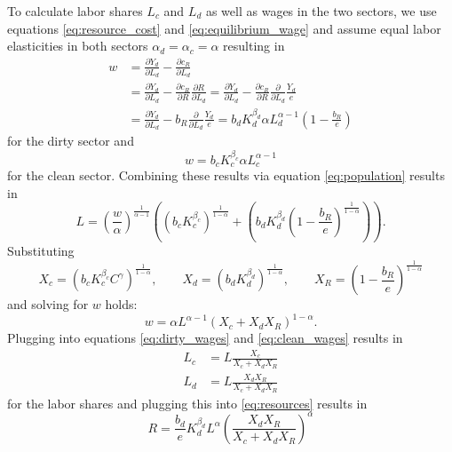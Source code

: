 To calculate labor shares $L_c$ and $L_d$ as well as wages in the two sectors, we use equations \eqref{eq:resource_cost} and \eqref{eq:equilibrium_wage} and assume equal labor elasticities in both sectors $\alpha_d = \alpha_c = \alpha$ resulting in
\begin{align}
	w &= \frac{\partial Y_d}{\partial L_d} - \frac{\partial c_R}{\partial L_d} \nonumber \\
	&= \frac{\partial Y_d}{\partial L_d} - \frac{\partial c_R}{\partial R} \frac{\partial R}{\partial L_d} \nonumber = \frac{\partial Y_d}{\partial L_d} - \frac{\partial c_R}{\partial R} \frac{\partial}{\partial L_d} \frac{Y_d}{e} \nonumber \\
	&= \frac{\partial Y_d}{\partial L_d} - b_R \frac{\partial}{\partial L_d} \frac{Y_d}{e} = b_d K_d^{\beta_d} \alpha L_d^{\alpha-1}\left( 1-\frac{b_R}{e} \right)
	\label{eq:dirty_wages}
\end{align}
for the dirty sector and
\begin{equation}
	w = b_c K_c^{\beta_c} \alpha L_c^{\alpha-1}
	\label{eq:clean_wages}
\end{equation}
for the clean sector. Combining these results via equation \eqref{eq:population} results in
\begin{equation}
	L = \left( \frac{w}{\alpha} \right)^{\frac{1}{\alpha-1}}\left( \left( b_c K_c^{\beta_c} \right)^{\frac{1}{1-\alpha}} + \left( b_d K_d^{\beta_d} \left( 1 - \frac{b_R}{e} \right)^{\frac{1}{1-\alpha}} \right) \right).
\end{equation}
Substituting 
\begin{equation}
	X_c = (b_c K_c^{\beta_c}C^{\gamma})^{\frac{1}{1-\alpha}}, \qquad X_d = (b_d K_d^{\beta_d})^{\frac{1}{1-\alpha}}, \qquad X_R = \left( 1 - \frac{b_R}{e} \right)^{\frac{1}{1-\alpha}}
	\label{eq:substitutions}
\end{equation}
and solving for $w$ holds:
\begin{equation}
	w = \alpha L^{\alpha-1}\left( X_c + X_d X_R \right)^{1-\alpha}.
	\label{eq:wage_result}
\end{equation}
Plugging into equations \eqref{eq:dirty_wages} and \eqref{eq:clean_wages} results in 
\begin{align}
	L_c &= L \frac{X_c}{X_c + X_d X_R} \label{eq:clean_labor} \\
	L_d &= L \frac{X_d X_R}{X_c + X_d X_R} \label{eq:dirty_labor}
\end{align}
for the labor shares and plugging this into \eqref{eq:resources} results in
\begin{equation}
	R = \frac{b_d}{e}K_d^{\beta_d}L^{\alpha}\left( \frac{X_d X_R}{X_c + X_d X_R} \right)^{\alpha}
	\label{eq:R_result}
\end{equation}
